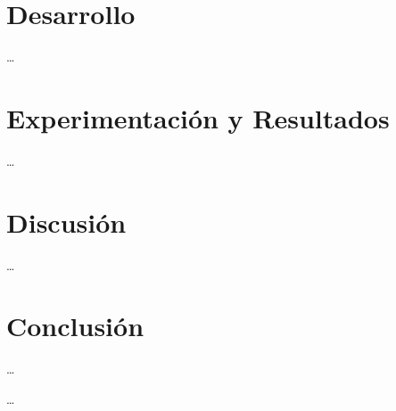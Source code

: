 \documentclass{article}
\begin{document}
  \section{Desarrollo} \label{development}
  \ldots

  \section{Experimentación y Resultados} \label{results}
  \ldots

  \section{Discusión} \label{discussion}
  \ldots

  \section{Conclusión} \label{conclusion}
  \ldots

  \begin{thebibliography}{9}

     \ldots

  \end{thebibliography}
\end{document}
